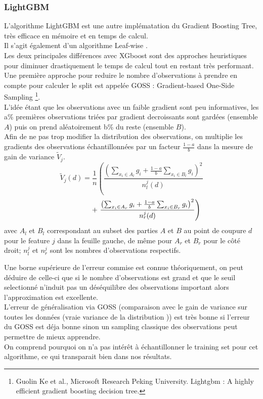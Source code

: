 \documentclass[french]{article}
\begin{document}
\begin{multicols}{2}
\subsubsection{LightGBM}
L'algorithme LightGBM est une autre implématation du Gradient Boosting Tree, très efficace en mémoire et en temps de calcul.\\
Il s'agit également d'un algorithme \og Leaf-wise \fg{}.\\
Les deux principales différences avec XGboost sont des approches heuristiques pour diminuer drastiquement le temps de calcul tout en restant très performant.\\
Une première approche pour reduire le nombre d'observations à prendre en compte pour calculer le split est appelée GOSS : \og Gradient-based One-Side Sampling \fg{}\footnote{\cite{micr} Guolin Ke et al., Microsoft Research Peking University. Lightgbm : A highly efficient gradient boosting decision tree.}.\\
L'idée étant que les observations avec un faible gradient sont peu informatives, les a\% premières observations triées par gradient decroissants sont gardées (ensemble $A$) puis on prend aléatoirement b\% du reste (ensemble $B$).\\
Afin de ne pas trop modifier la distribution des observations, on multiplie les gradients des observations échantillonnées par un facteur $\frac{1-a}{b}$ dans la mesure de gain de variance $\tilde{V}_{j}$.\\
\[
\tilde{V}_{j}(d)=\frac{1}{n}\left(\frac{\left(\sum_{x_{i} \in A_{l}} g_{i}+\frac{1-a}{b} \sum_{x_{i} \in B_{l}} g_{i}\right)^{2}}{n_{l}^{j}(d)} \right. \]
\[ \null \qquad \qquad + \left. \frac{\left(\sum_{x_{i} \in A_{r}} g_{i}+\frac{1-a}{b} \sum_{x_{i} \in B_{r}} g_{i}\right)^{2}}{n_{r}^{j}(d)}\right)
\]
avec $A_l$ et $B_l$ correspondant au subset des parties $A$ et $B$ au point de coupure $d$ pour le feature $j$ dans la feuille gauche, de même pour $A_r$ et $B_r$ pour le côté droit; $n_l^j$ et $n_r^j$ sont les nombres d'observations respectifs\footnotemark[14].

Une borne supérieure de l'erreur commise est connue théoriquement, on peut déduire de celle-ci que si le nombre d'observations est grand et que le seuil selectionné n'induit pas un déséquilibre des observations important alors l'approximation est excellente.\\
L'erreur de généralisation via GOSS (comparaison avec le gain de variance sur toutes les données (\og vraie variance de la distribution \fg{})) est très bonne si l'erreur du GOSS est déja bonne sinon un sampling classique des observations peut permettre de mieux apprendre.\\
On comprend pourquoi on n'a pas intérêt à échantillonner le training set pour cet algorithme, ce qui transparait bien dans nos résultats.


\end{multicols}
\end{document}
